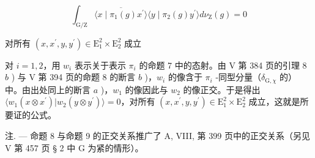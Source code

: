 \[
\int_ {\mathrm{G} / \mathrm{Z}} \overline {{\langle x \mid \pi_ {1} (g) x ^ {\prime} \rangle}} \langle y \mid \pi_ {2} (g) y ^ {\prime} \rangle d \nu_ {\mathrm{Z}} (g) = 0
\]

对所有 \((x,x^{\prime},y,y^{\prime})\in \mathrm{E}_{1}^{2}\times \mathrm{E}_{2}^{2}\) 成立

 对 \(i=1,2\)，用 \(w_{i}\) 表示关于表示 \(\pi_{i}\) 的命题 7 中的态射。由 V 第 384 页的引理 8 \(b\) ) 与 V 第 394 页的命题 8 的断言 \(b\) )，\(w_{i}\) 的像含于 \(\pi_{i}\) -同型分量（\(\delta_{\mathrm{G},\chi}\) 的）中。由出处同上的断言 \(a\) )，\(w_{1}\) 的像因此与 \(w_{2}\) 的像正交。于是得出 \(\langle w_{1}(x\otimes x^{\prime})|w_{2}(y\otimes y^{\prime})\rangle=0\)，对所有 \((x,x^{\prime},y,y^{\prime})\in\mathrm{E}_{1}^{2}\times\mathrm{E}_{2}^{2}\) 成立，这就是所要证的公式。

注. --- 命题 8 与命题 9 的正交关系推广了 A, VIII, 第 399 页中的正交关系（另见 V 第 457 页 § 2 中 G 为紧的情形）。

